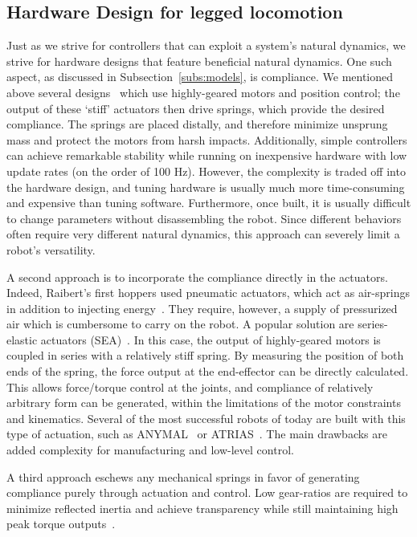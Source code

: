 \subsection{Hardware Design for legged locomotion}

Just as we strive for controllers that can exploit a system's natural dynamics, we strive for hardware designs that feature beneficial natural dynamics.
One such aspect, as discussed in Subsection~\ref{subs:models}, is compliance.
We mentioned above several designs~\cite{sprowitz2013towards,buchli2006resonance,altendorfer2001rhex,owaki2013simple} which use highly-geared motors and position control; the output of these `stiff' actuators then drive springs, which provide the desired compliance. The springs are placed distally, and therefore minimize unsprung mass and protect the motors from harsh impacts. Additionally, simple controllers can achieve remarkable stability while running on inexpensive hardware with low update rates (on the order of 100 Hz). However, the complexity is traded off into the hardware design, and tuning hardware is usually much more time-consuming and expensive than tuning software. Furthermore, once built, it is usually difficult to change parameters without disassembling the robot. Since different behaviors often require very different natural dynamics, this approach can severely limit a robot's versatility. \par
A second approach is to incorporate the compliance directly in the actuators. Indeed, Raibert's first hoppers used pneumatic actuators, which act as air-springs in addition to injecting energy~\cite{raibert1986legged}. They require, however, a supply of pressurized air which is cumbersome to carry on the robot. %
A popular solution are series-elastic actuators (SEA)~\cite{pratt1995series}. In this case, the output of highly-geared motors is coupled in series with a relatively stiff spring. By measuring the position of both ends of the spring, the force output at the end-effector can be directly calculated. This allows force/torque control at the joints, and compliance of relatively arbitrary form can be generated, within the limitations of the motor constraints and kinematics. Several of the most successful robots of today are built with this type of actuation, such as ANYMAL~\cite{hutter2016anymal} or ATRIAS~\cite{hubicki2016atrias}. The main drawbacks are added complexity for manufacturing and low-level control.
\par
A third approach eschews any mechanical springs in favor of generating compliance purely through actuation and control. Low gear-ratios are required to minimize reflected inertia and achieve transparency while still maintaining high peak torque outputs~\cite{Seok2012proprioceptive}.
